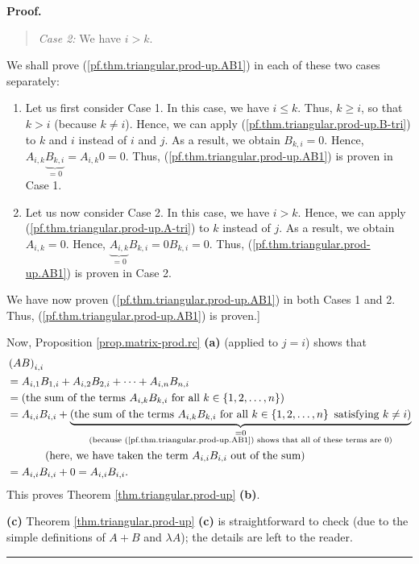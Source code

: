 \documentclass[numbers=enddot,12pt,final,onecolumn,notitlepage]{scrartcl}%
\theoremstyle{definition}
\newenvironment{statement}{\begin{quote}}{\end{quote}}
\newenvironment{proof}[1][Proof]{\noindent\textbf{#1.} }{\ \rule{0.5em}{0.5em}}
\begin{document}
\begin{proof}
\begin{statement}
\textit{Case 2:} We have $i>k$.
\end{statement}

We shall prove (\ref{pf.thm.triangular.prod-up.AB1}) in each of these two
cases separately:

\begin{enumerate}
\item Let us first consider Case 1. In this case, we have $i\leq k$. Thus,
$k\geq i$, so that $k>i$ (because $k\neq i$). Hence, we can apply
(\ref{pf.thm.triangular.prod-up.B-tri}) to $k$ and $i$ instead of $i$ and $j$.
As a result, we obtain $B_{k,i}=0$. Hence, $A_{i,k}\underbrace{B_{k,i}}%
_{=0}=A_{i,k}0=0$. Thus, (\ref{pf.thm.triangular.prod-up.AB1}) is proven in
Case 1.

\item Let us now consider Case 2. In this case, we have $i>k$. Hence, we can
apply (\ref{pf.thm.triangular.prod-up.A-tri}) to $k$ instead of $j$. As a
result, we obtain $A_{i,k}=0$. Hence, $\underbrace{A_{i,k}}_{=0}%
B_{k,i}=0B_{k,i}=0$. Thus, (\ref{pf.thm.triangular.prod-up.AB1}) is proven in
Case 2.
\end{enumerate}

We have now proven (\ref{pf.thm.triangular.prod-up.AB1}) in both Cases 1 and
2. Thus, (\ref{pf.thm.triangular.prod-up.AB1}) is proven.]

Now, Proposition \ref{prop.matrix-prod.rc} \textbf{(a)} (applied to $j=i$)
shows that%
\begin{align*}
&  \left(  AB\right)  _{i,i}\\
&  =A_{i,1}B_{1,i}+A_{i,2}B_{2,i}+\cdots+A_{i,n}B_{n,i}\\
&  =\left(  \text{the sum of the terms }A_{i,k}B_{k,i}\text{ for all }%
k\in\left\{  1,2,\ldots,n\right\}  \right) \\
&  =A_{i,i}B_{i,i}+\underbrace{\left(  \text{the sum of the terms }%
A_{i,k}B_{k,i}\text{ for all }k\in\left\{  1,2,\ldots,n\right\}  \text{
satisfying }k\neq i\right)  }_{\substack{=0\\\text{(because
(\ref{pf.thm.triangular.prod-up.AB1}) shows that all of these terms are
}0\text{)}}}\\
&  \ \ \ \ \ \ \ \ \ \ \left(  \text{here, we have taken the term }%
A_{i,i}B_{i,i}\text{ out of the sum}\right) \\
&  =A_{i,i}B_{i,i}+0=A_{i,i}B_{i,i}.
\end{align*}
This proves Theorem \ref{thm.triangular.prod-up} \textbf{(b)}.

\textbf{(c)} Theorem \ref{thm.triangular.prod-up} \textbf{(c)} is
straightforward to check (due to the simple definitions of $A+B$ and $\lambda
A$); the details are left to the reader.
\end{proof}
\end{document}
